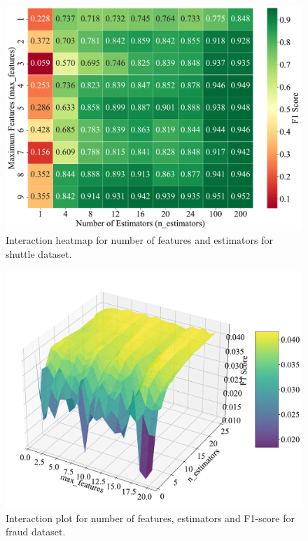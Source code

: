 \documentclass[10pt, conference]{IEEEtran}
\begin{document}
\begin{figure}[H]
	\centering
	\includegraphics[width=0.95\linewidth]{../results/shuttle/max_features/interaction_f1_heatmap.pdf}
	\caption{Interaction heatmap for number of features and estimators for shuttle dataset.}
	\label{fig:int_hm_shuttle}
\end{figure}


\begin{figure}[H]
	\centering
	\includegraphics[width=0.95\linewidth]{../results/fraud/max_features/interaction_3d_surface.pdf}
	\caption{Interaction plot for number of features, estimators and F1-score for fraud dataset.}
	\label{fig:int_3d_fraud}
\end{figure}
\end{document}
